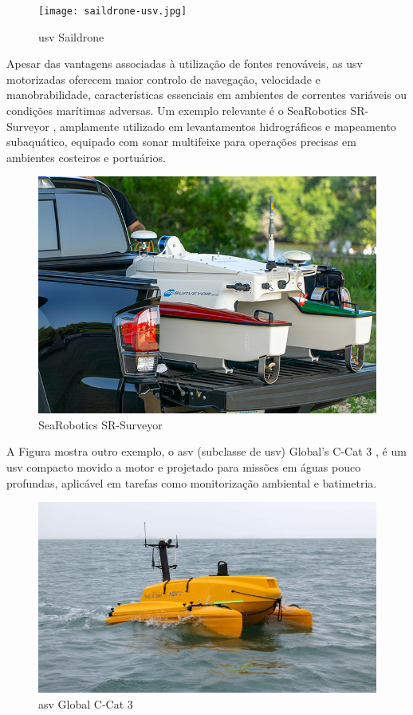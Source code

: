 \begin{figure}[H]
    \centering
    \texttt{[image: saildrone-usv.jpg]}
    \caption[\gls{usv} Saildrone]{\gls{usv} Saildrone \cite{saildrone}}
    \label{fig:saildrone}
\end{figure}

Apesar das vantagens associadas à utilização de fontes renováveis, as \gls{usv} motorizadas oferecem maior controlo de navegação, velocidade e manobrabilidade, características essenciais em ambientes de correntes variáveis ou condições marítimas adversas. Um exemplo relevante é o SeaRobotics SR-Surveyor \cite{sr-surveyor-class}, amplamente utilizado em levantamentos hidrográficos e mapeamento subaquático, equipado com sonar multifeixe para operações precisas em ambientes costeiros e portuários.  

\begin{figure}[H]
    \centering
    \includegraphics[width=0.5\linewidth]{figuras/sr-surveyorm18-truck-bed.jpg}
    \caption[SeaRobotics SR-Surveyor]{SeaRobotics SR-Surveyor \cite{sr-surveyor-image}}
    \label{fig:sr-surveyor-carrinha}
\end{figure}

A Figura  mostra outro exemplo, o \gls{asv} (subclasse de \gls{usv}) Global's C-Cat 3 \cite{c-cat-3-asv}, é um \gls{usv} compacto movido a motor e projetado para missões em águas pouco profundas, aplicável em tarefas como monitorização ambiental e batimetria. 

\begin{figure}[H]
    \centering
    \includegraphics[width=0.5\linewidth]{figuras/c-cat3.jpeg}
    \caption[\gls{asv} Global C-Cat 3]{\gls{asv} Global C-Cat 3 \cite{c-cat-3-asv}}
    \label{fig:c-cat-3-asv}
\end{figure}

